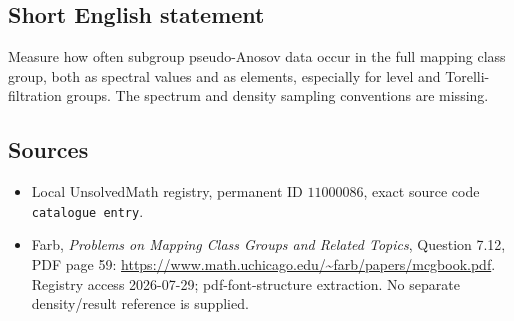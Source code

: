 \documentclass[11pt]{article}
\begin{document}
\subsection{Short English statement}
Measure how often subgroup pseudo-Anosov data occur in the full mapping class group, both as spectral values and as elements, especially for level and Torelli-filtration groups. The spectrum and density sampling conventions are missing.
\subsection{Sources}
\begin{itemize}
\item Local UnsolvedMath registry, permanent ID \(11000086\), exact source code \texttt{catalogue entry}.
\item Farb, \emph{Problems on Mapping Class Groups and Related Topics}, Question 7.12, PDF page 59: \url{https://www.math.uchicago.edu/~farb/papers/mcgbook.pdf}. Registry access 2026-07-29; pdf-font-structure extraction. No separate density/result reference is supplied.
\end{itemize}
\end{document}
